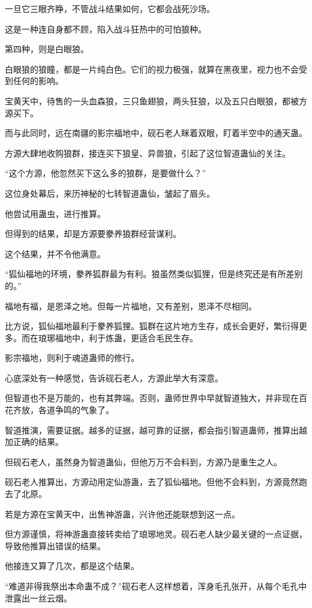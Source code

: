 \begin{this_body}
一旦它三眼齐睁，不管战斗结果如何，它都会战死沙场。

这是一种连自身都不顾，陷入战斗狂热中的可怕狼种。

第四种，则是白眼狼。

白眼狼的狼瞳，都是一片纯白色。它们的视力极强，就算在黑夜里，视力也不会受到任何的影响。

宝黄天中，待售的一头血森狼，三只鱼翅狼，两头狂狼，以及五只白眼狼，都被方源买下。

而与此同时，远在南疆的影宗福地中，砚石老人眯着双眼，盯着半空中的通天蛊。

方源大肆地收购狼群，接连买下狼皇、异兽狼，引起了这位智道蛊仙的关注。

“这个方源，他忽然买下这么多的狼群，是要做什么？”

这位身处幕后，来历神秘的七转智道蛊仙，皱起了眉头。

他尝试用蛊虫，进行推算。

但得到的结果，却是方源要豢养狼群经营谋利。

这个结果，并不令他满意。

“狐仙福地的环境，豢养狐群最为有利。狼虽然类似狐狸，但是终究还是有所差别的。”

福地有福，是恩泽之地。但每一片福地，又有差别，恩泽不尽相同。

比方说，狐仙福地最利于豢养狐狸。狐群在这片地方生存，成长会更好，繁衍得更多。而在琅琊福地中，利于炼蛊，更适合毛民生存。

影宗福地，则利于魂道蛊师的修行。

心底深处有一种感觉，告诉砚石老人，方源此举大有深意。

但智道也不是万能的，也有其弊端。否则，蛊师世界中早就智道独大，并非现在百花齐放，各道争鸣的气象了。

智道推演，需要证据。越多的证据，越可靠的证据，都会指引智道蛊师，推算出越加正确的结果。

但砚石老人，虽然身为智道蛊仙，但他万万不会料到，方源乃是重生之人。

砚石老人推算出，方源动用定仙游蛊，去了狐仙福地。但他不会料到，方源竟然跑去了北原。

若是方源在宝黄天中，出售神游蛊，兴许他还能联想到这一点。

但方源谨慎，将神游蛊直接转卖给了琅琊地灵。砚石老人缺少最关键的一点证据，导致他推算出错误的结果。

他接连又算了几次，都是这个结果。

“难道非得我祭出本命蛊不成？”砚石老人这样想着，浑身毛孔张开，从每个毛孔中泄露出一丝云烟。


\end{this_body}
